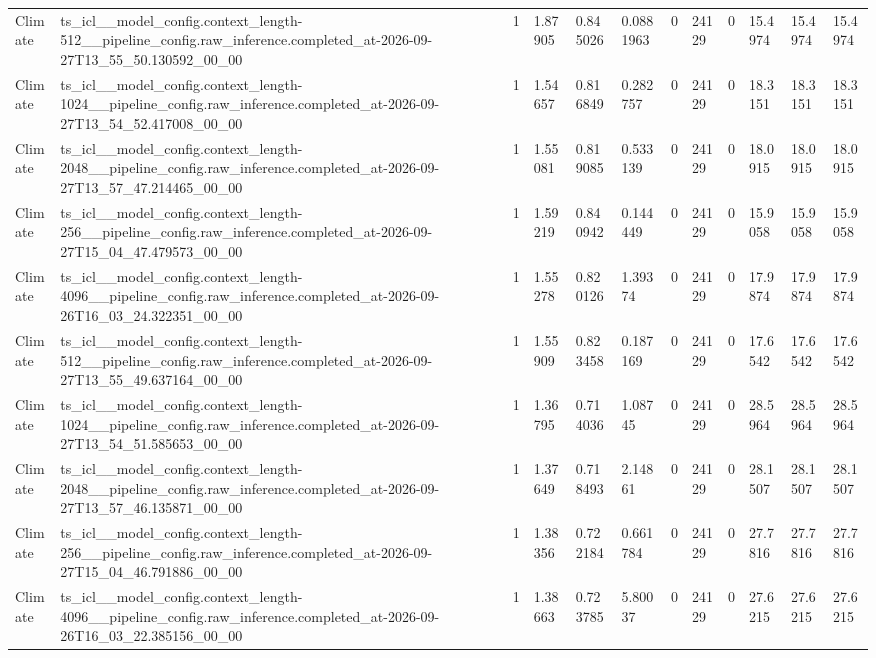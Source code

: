 \begin{tabular}{llllllllllll}
Climate & ts\_icl\_\_model\_config.context\_length-512\_\_pipeline\_config.raw\_inference.completed\_at-2026-09-27T13\_55\_50.130592\_00\_00 & 1 & 1.87905 & 0.845026 & 0.0881963 & 0 & 24129 & 0 & 15.4974 & 15.4974 & 15.4974 \\
Climate & ts\_icl\_\_model\_config.context\_length-1024\_\_pipeline\_config.raw\_inference.completed\_at-2026-09-27T13\_54\_52.417008\_00\_00 & 1 & 1.54657 & 0.816849 & 0.282757 & 0 & 24129 & 0 & 18.3151 & 18.3151 & 18.3151 \\
Climate & ts\_icl\_\_model\_config.context\_length-2048\_\_pipeline\_config.raw\_inference.completed\_at-2026-09-27T13\_57\_47.214465\_00\_00 & 1 & 1.55081 & 0.819085 & 0.533139 & 0 & 24129 & 0 & 18.0915 & 18.0915 & 18.0915 \\
Climate & ts\_icl\_\_model\_config.context\_length-256\_\_pipeline\_config.raw\_inference.completed\_at-2026-09-27T15\_04\_47.479573\_00\_00 & 1 & 1.59219 & 0.840942 & 0.144449 & 0 & 24129 & 0 & 15.9058 & 15.9058 & 15.9058 \\
Climate & ts\_icl\_\_model\_config.context\_length-4096\_\_pipeline\_config.raw\_inference.completed\_at-2026-09-26T16\_03\_24.322351\_00\_00 & 1 & 1.55278 & 0.820126 & 1.39374 & 0 & 24129 & 0 & 17.9874 & 17.9874 & 17.9874 \\
Climate & ts\_icl\_\_model\_config.context\_length-512\_\_pipeline\_config.raw\_inference.completed\_at-2026-09-27T13\_55\_49.637164\_00\_00 & 1 & 1.55909 & 0.823458 & 0.187169 & 0 & 24129 & 0 & 17.6542 & 17.6542 & 17.6542 \\
Climate & ts\_icl\_\_model\_config.context\_length-1024\_\_pipeline\_config.raw\_inference.completed\_at-2026-09-27T13\_54\_51.585653\_00\_00 & 1 & 1.36795 & 0.714036 & 1.08745 & 0 & 24129 & 0 & 28.5964 & 28.5964 & 28.5964 \\
Climate & ts\_icl\_\_model\_config.context\_length-2048\_\_pipeline\_config.raw\_inference.completed\_at-2026-09-27T13\_57\_46.135871\_00\_00 & 1 & 1.37649 & 0.718493 & 2.14861 & 0 & 24129 & 0 & 28.1507 & 28.1507 & 28.1507 \\
Climate & ts\_icl\_\_model\_config.context\_length-256\_\_pipeline\_config.raw\_inference.completed\_at-2026-09-27T15\_04\_46.791886\_00\_00 & 1 & 1.38356 & 0.722184 & 0.661784 & 0 & 24129 & 0 & 27.7816 & 27.7816 & 27.7816 \\
Climate & ts\_icl\_\_model\_config.context\_length-4096\_\_pipeline\_config.raw\_inference.completed\_at-2026-09-26T16\_03\_22.385156\_00\_00 & 1 & 1.38663 & 0.723785 & 5.80037 & 0 & 24129 & 0 & 27.6215 & 27.6215 & 27.6215 \\

\end{tabular}
